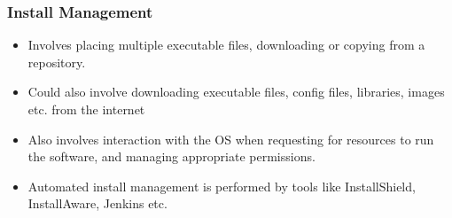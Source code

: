 \documentclass{article}
\begin{document}
\subsubsection{Install Management}
\begin{itemize}
    \item Involves placing multiple executable files, downloading or copying from a repository. 
    
    \item Could also involve downloading executable files, config files, libraries, images etc. from the internet
    
    \item Also involves interaction with the OS when requesting for resources to run the software, and managing appropriate permissions. 
    
    \item Automated install management is performed by tools like InstallShield, InstallAware, Jenkins etc.
\end{itemize}
\end{document}
